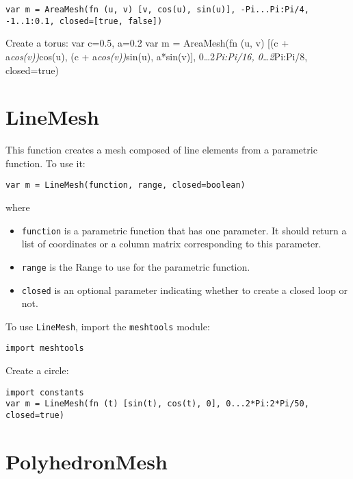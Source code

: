 \begin{lstlisting}
var m = AreaMesh(fn (u, v) [v, cos(u), sin(u)], -Pi...Pi:Pi/4, -1..1:0.1, closed=[true, false])
\end{lstlisting}

Create a torus: var c=0.5, a=0.2 var m = AreaMesh(fn (u, v) {[}(c +
a\emph{cos(v))}cos(u), (c + a\emph{cos(v))}sin(u), a*sin(v){]},
0\ldots2\emph{Pi:Pi/16, 0\ldots2}Pi:Pi/8, closed=true)

\hypertarget{linemesh}{%
\section{LineMesh}\label{linemesh}}

This function creates a mesh composed of line elements from a parametric
function. To use it:

\begin{lstlisting}
var m = LineMesh(function, range, closed=boolean)
\end{lstlisting}

where

\begin{itemize}

\item
  \texttt{function} is a parametric function that has one parameter. It
  should return a list of coordinates or a column matrix corresponding
  to this parameter.
\item
  \texttt{range} is the Range to use for the parametric function.
\item
  \texttt{closed} is an optional parameter indicating whether to create
  a closed loop or not.
\end{itemize}

To use \texttt{LineMesh}, import the \texttt{meshtools} module:

\begin{lstlisting}
import meshtools
\end{lstlisting}

Create a circle:

\begin{lstlisting}
import constants
var m = LineMesh(fn (t) [sin(t), cos(t), 0], 0...2*Pi:2*Pi/50, closed=true)
\end{lstlisting}

\hypertarget{polyhedronmesh}{%
\section{PolyhedronMesh}\label{polyhedronmesh}}


